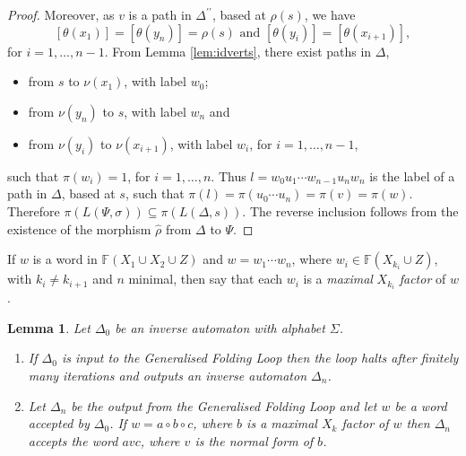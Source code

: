 \documentclass[a4paper,12pt]{article}
\renewcommand{\a}{\alpha }
\renewcommand{\b}{\beta }
\newcommand{\g}{\gamma }
\newcommand{\D}{\Delta }
\newcommand{\T}{\Theta }
\renewcommand{\L}{\Lambda }
\newcommand{\s}{\sigma }
\renewcommand{\S}{\Sigma }
\newtheorem{lemma}[theorem]{Lemma}
\numberwithin{equation}{section}
\numberwithin{figure}{section}
\newcommand{\FF}{\ensuremath{\mathbb{F}}}
\newcommand{\be}{\begin{enumerate}}
\newcommand{\ee}{\end{enumerate}}
\begin{document}
\begin{proof}
 Moreover, as $v$ is a path in $\D^{\prime\prime}$, based at $\rho(s)$,
we have
\[[\theta(x_1)]=[\theta(y_n)]=\rho(s)\textrm{ and }[\theta(y_i)]=[\theta(x_{i+1})],\]
for $i=1,\ldots ,n-1$. From Lemma \ref{lem:idverts}, there exist paths in
$\D$,
\begin{itemize}
\item
from $s$ to $\nu(x_1)$, with label $w_0$;
\item  from $\nu(y_n)$ to $s$, with label $w_n$ and
\item from $\nu(y_i)$ to $\nu(x_{i+1})$, with label $w_i$, for $i=1,\ldots,
n-1$,
\end{itemize}
such that $\pi(w_i)=1$, for $i=1,\ldots ,n$. Thus $l=w_0u_1\cdots w_{n-1}u_n
w_n$ is the label of a path in $\D$, based at $s$, such that
$\pi(l)=\pi(u_0\cdots u_n)=\pi(v)=\pi(w)$.
 Therefore
$\pi(L(\Psi,\s))\subseteq \pi(L(\D,s))$. The reverse inclusion follows
from the existence of the morphism $\hat\rho$ from $\D$ to $\Psi$.

\end{proof}
If $w$ is a word in $\FF(X_1\cup X_2\cup Z)$ and $w=w_1\cdots w_n$,
where $w_i\in \FF(X_{k_i}\cup Z)$, with $k_i\neq k_{i+1}$ and $n$
minimal, then  say that each $w_i$ is a \emph {maximal} $X_{k_i}$
\emph{factor}
of $w$.
\begin{lemma}\label{lem:loopstop}
Let $\D_0$ be an inverse automaton with alphabet $\S$.
\be
\item\label{it:loopstop1}
If $\D_0$ is input  to  the Generalised Folding Loop then the loop halts after
finitely many iterations and outputs an inverse automaton  $\D_n$.
\item\label{it:loopstop2} Let $\D_n$ be the output from the Generalised 
Folding Loop and let $w$ be a word
accepted by $\D_0$. If $w=a\circ b \circ c$,
where $b$ is a maximal $X_k$ factor of $w$ then $\D_n$ accepts
the word $avc$, where $v$ is the normal form of $b$.
\ee
\end{lemma}
\end{document}
